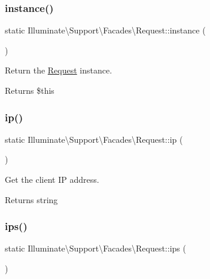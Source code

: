 \subsubsection{\texorpdfstring{instance()}{instance()}}
{\footnotesize\ttfamily static Illuminate\textbackslash{}\+Support\textbackslash{}\+Facades\textbackslash{}\+Request\+::instance (\begin{DoxyParamCaption}{ }\end{DoxyParamCaption})\hspace{0.3cm}{\ttfamily [static]}}

Return the \mbox{\hyperlink{class_illuminate_1_1_support_1_1_facades_1_1_request}{Request}} instance.

\begin{DoxyReturn}{Returns}
\$this 
\end{DoxyReturn}
\mbox{\label{class_illuminate_1_1_support_1_1_facades_1_1_request_a4c0dc61a627ddae9c7c3ec74d845e483}} 
\subsubsection{\texorpdfstring{ip()}{ip()}}
{\footnotesize\ttfamily static Illuminate\textbackslash{}\+Support\textbackslash{}\+Facades\textbackslash{}\+Request\+::ip (\begin{DoxyParamCaption}{ }\end{DoxyParamCaption})\hspace{0.3cm}{\ttfamily [static]}}

Get the client IP address.

\begin{DoxyReturn}{Returns}
string 
\end{DoxyReturn}
\mbox{\label{class_illuminate_1_1_support_1_1_facades_1_1_request_a907a99501b1a1f7a8349e71a5a51ee2b}} 
\subsubsection{\texorpdfstring{ips()}{ips()}}
{\footnotesize\ttfamily static Illuminate\textbackslash{}\+Support\textbackslash{}\+Facades\textbackslash{}\+Request\+::ips (\begin{DoxyParamCaption}{ }\end{DoxyParamCaption})\hspace{0.3cm}{\ttfamily [static]}}

